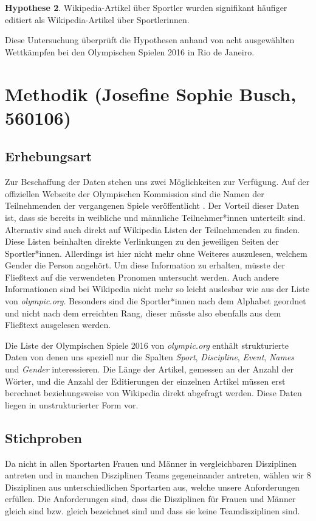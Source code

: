 \documentclass[11pt]{article}
\begin{document}
\textbf{Hypothese 2}. Wikipedia-Artikel über Sportler wurden signifikant häufiger editiert als Wikipedia-Artikel über Sportlerinnen.

Diese Untersuchung überprüft die Hypothesen anhand von acht ausgewählten Wettkämpfen bei den Olympischen Spielen 2016 in Rio de Janeiro.

\section{Methodik (Josefine Sophie Busch, 560106)}
\label{igw}

\subsection{Erhebungsart}
Zur Beschaffung der Daten stehen uns zwei Möglichkeiten zur Verfügung. Auf der offiziellen Webseite der Olympischen Kommission sind die Namen der Teilnehmenden der vergangenen Spiele veröffentlicht \parencite{olympicResults}. Der Vorteil dieser Daten ist, dass sie bereits in weibliche und männliche Teilnehmer*innen unterteilt sind. Alternativ sind auch direkt auf Wikipedia Listen der Teilnehmenden zu finden. \parencite{wikiOlympicComp} Diese Listen beinhalten direkte Verlinkungen zu den jeweiligen Seiten der Sportler*innen. Allerdings ist hier nicht mehr ohne Weiteres auszulesen, welchem Gender die Person angehört. Um diese Information zu erhalten, müsste der Fließtext auf die verwendeten Pronomen untersucht werden. Auch andere Informationen sind bei Wikipedia nicht mehr so leicht auslesbar wie aus der Liste von \textit{olympic.org}. Besonders sind die Sportler*innen nach dem Alphabet geordnet und nicht nach dem erreichten Rang, dieser müsste also ebenfalls aus dem Fließtext ausgelesen werden.

Die Liste der Olympischen Spiele 2016 von \textit{olympic.org} enthält strukturierte Daten von denen uns speziell nur die Spalten \textit{Sport}, \textit{Discipline}, \textit{Event}, \textit{Names} und \textit{Gender} interessieren.
Die Länge der Artikel, gemessen an der Anzahl der Wörter, und die Anzahl der Editierungen der einzelnen Artikel müssen erst berechnet beziehungsweise von Wikipedia direkt abgefragt werden. Diese Daten liegen in unstrukturierter Form vor.

\subsection{Stichproben}
Da nicht in allen Sportarten Frauen und Männer in vergleichbaren Disziplinen antreten und in manchen Disziplinen Teams gegeneinander antreten, wählen wir 8 Disziplinen aus unterschiedlichen Sportarten aus, welche unsere Anforderungen erfüllen. Die Anforderungen sind, dass die Disziplinen für Frauen und Männer gleich sind bzw. gleich bezeichnet sind und dass sie keine Teamdisziplinen sind.
\end{document}

